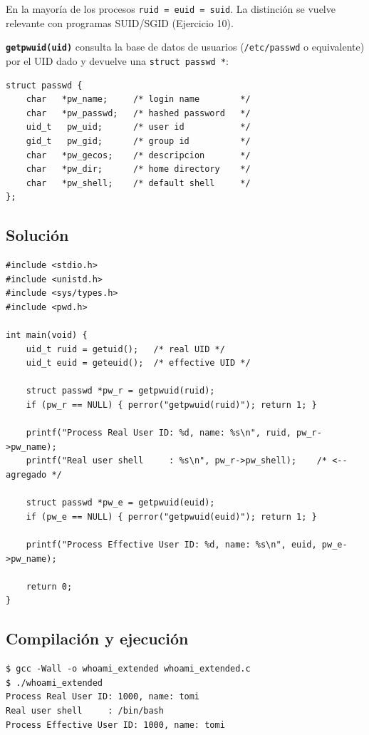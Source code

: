 \documentclass[11pt,a4paper]{article}
\begin{document}
En la mayoría de los procesos \texttt{ruid = euid = suid}. La
distinción se vuelve relevante con programas SUID/SGID (Ejercicio 10).

\textbf{\texttt{getpwuid(uid)}} consulta la base de datos de usuarios
(\texttt{/etc/passwd} o equivalente) por el UID dado y devuelve una
\texttt{struct passwd *}:

\begin{lstlisting}[style=cstyle]
struct passwd {
    char   *pw_name;     /* login name        */
    char   *pw_passwd;   /* hashed password   */
    uid_t   pw_uid;      /* user id           */
    gid_t   pw_gid;      /* group id          */
    char   *pw_gecos;    /* descripcion       */
    char   *pw_dir;      /* home directory    */
    char   *pw_shell;    /* default shell     */
};
\end{lstlisting}

\subsection*{Solución}

\begin{lstlisting}[style=cstyle]
#include <stdio.h>
#include <unistd.h>
#include <sys/types.h>
#include <pwd.h>

int main(void) {
    uid_t ruid = getuid();   /* real UID */
    uid_t euid = geteuid();  /* effective UID */

    struct passwd *pw_r = getpwuid(ruid);
    if (pw_r == NULL) { perror("getpwuid(ruid)"); return 1; }

    printf("Process Real User ID: %d, name: %s\n", ruid, pw_r->pw_name);
    printf("Real user shell     : %s\n", pw_r->pw_shell);    /* <-- agregado */

    struct passwd *pw_e = getpwuid(euid);
    if (pw_e == NULL) { perror("getpwuid(euid)"); return 1; }

    printf("Process Effective User ID: %d, name: %s\n", euid, pw_e->pw_name);

    return 0;
}
\end{lstlisting}

\subsection*{Compilación y ejecución}

\begin{lstlisting}[style=shellstyle]
$ gcc -Wall -o whoami_extended whoami_extended.c
$ ./whoami_extended
Process Real User ID: 1000, name: tomi
Real user shell     : /bin/bash
Process Effective User ID: 1000, name: tomi
\end{lstlisting}
\end{document}
